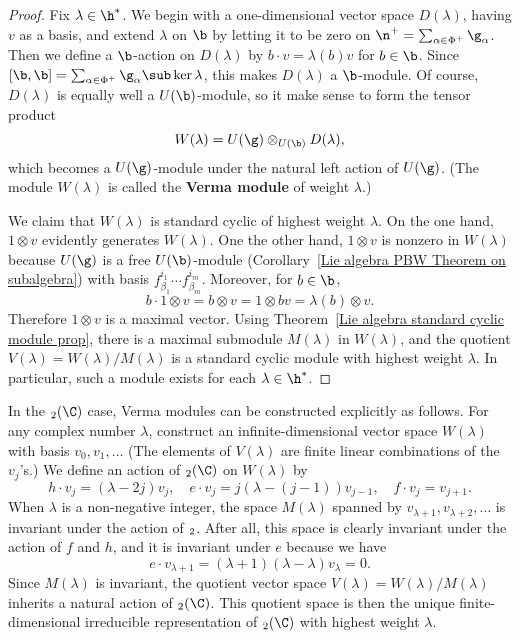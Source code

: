 \begin{proof}
Fix $\lambda\in\h^*$. We begin with a one-dimensional vector space $D(\lambda)$, having $v$ as a basis, and extend $\lambda$ on $\b$ by letting it to be zero on $\n^+=\sum_{\alpha\in\Phi^+}\g_\alpha$. Then we define a $\b$-action on $D(\lambda)$ by $b\cdot v=\lambda(b)v$ for $b\in\b$. Since $[\b,\b]=\sum_{\alpha\in\Phi^+}\g_\alpha\sub\ker\lambda$, this makes $D(\lambda)$ a $\b$-module. Of course, $D(\lambda)$ is equally well a $U(\b)$-module, so it make sense to form the tensor product
\[W(\lambda)=U(\g)\otimes_{U(\b)}D(\lambda),\]
which becomes a $U(\g)$-module under the natural left action of $U(\g)$. (The module $W(\lambda)$ is called the \textbf{Verma module} of weight $\lambda$.)\par
We claim that $W(\lambda)$ is standard cyclic of highest weight $\lambda$. On the one hand, $1\otimes v$ evidently generates $W(\lambda)$. One the other hand, $1\otimes v$ is nonzero in $W(\lambda)$ because $U(\g)$ is a free $U(\b)$-module (Corollary~\ref{Lie algebra PBW Theorem on subalgebra}) with basis $f_{\beta_1}^{i_1}\cdots f_{\beta_m}^{i_m}$. Moreover, for $b\in\b$,
\[b\cdot 1\otimes v=b\otimes v=1\otimes bv=\lambda(b)\otimes v.\]
Therefore $1\otimes v$ is a maximal vector. Using Theorem~\ref{Lie algebra standard cyclic module prop}, there is a maximal submodule $M(\lambda)$ in $W(\lambda)$, and the quotient $V(\lambda)=W(\lambda)/M(\lambda)$ is a standard cyclic module with highest weight $\lambda$. In particular, such a module exists for each $\lambda\in\h^*$.
\end{proof}
\begin{example}
In the $\sl_2(\C)$ case, Verma modules can be constructed explicitly as follows. For any complex number $\lambda$, construct an infinite-dimensional vector space $W(\lambda)$ with basis $v_0,v_1,\dots$ (The elements of $V(\lambda)$ are finite linear combinations of the $v_j$'s.) We define an action of $\sl_2(\C)$ on $W(\lambda)$ by
\[h\cdot v_j=(\lambda-2j)v_j,\quad e\cdot v_j=j(\lambda-(j-1))v_{j-1},\quad f\cdot v_j=v_{j+1}.\]
When $\lambda$ is a non-negative integer, the space $M(\lambda)$ spanned by $v_{\lambda+1},v_{\lambda+2},\dots$ is invariant under the action of $\sl_2$. After all, this space is clearly invariant under the action of $f$ and $h$, and it is invariant under $e$ because we have
\[e\cdot v_{\lambda+1}=(\lambda+1)(\lambda-\lambda)v_\lambda=0.\]
Since $M(\lambda)$ is invariant, the quotient vector space $V(\lambda)=W(\lambda)/M(\lambda)$ inherits a natural action of $\sl_2(\C)$. This quotient space is then the unique finite-dimensional irreducible representation of $\sl_2(\C)$ with highest weight $\lambda$.
\end{example}
